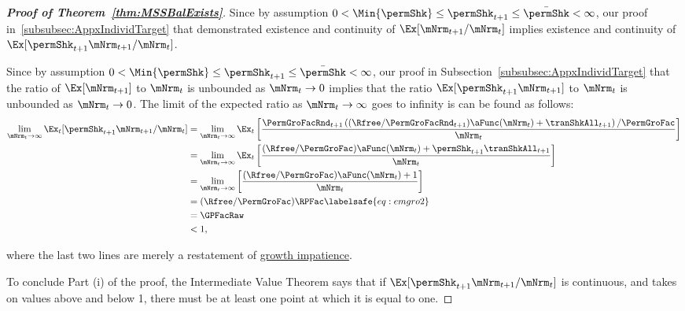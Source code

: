 \documentclass[\econtexRoot/BufferStockTheory]{subfiles}
\begin{document}
\begin{proof}[\textbf{Proof of Theorem~\ref{thm:MSSBalExists}}]

Since by assumption $ 0 < \Min{\permShk} \leq \permShk_{t+1} \leq \bar{\permShk} < \infty$, our proof in~\ref{subsubsec:AppxIndividTarget} that demonstrated existence and continuity of $\Ex[\mNrm_{t+1}/\mNrm_{t}]$ implies existence and continuity of $\Ex[\permShk_{t+1}\mNrm_{t+1}/\mNrm_{t}]$.



Since by assumption $ 0 < \Min{\permShk} \leq \permShk_{t+1} \leq \bar{\permShk} < \infty$, our proof in Subsection~\ref{subsubsec:AppxIndividTarget} that the ratio of $\Ex[\mNrm_{t+1}]$ to $\mNrm_{t}$ is unbounded as $\mNrm_{t} \rightarrow 0$ implies that the ratio $\Ex[\permShk_{t+1}\mNrm_{t+1}]$ to $\mNrm_{t}$ is unbounded as $\mNrm_{t} \rightarrow 0$. The limit of the expected ratio as $\mNrm_{t}\rightarrow \infty$ goes to infinity is can be found as follows:
%
\begin{align}
  \lim_{\mNrm_{t} \rightarrow \infty} \Ex_{t}[\permShk_{t+1}\mNrm_{t+1}/\mNrm_{t}]  & =   
                                                                  \lim_{\mNrm_{t} \rightarrow \infty} 
                                                                  \Ex_{t}\left[\frac{\PermGroFacRnd_{t+1}\left((\Rfree/\PermGroFacRnd_{t+1})\aFunc(\mNrm_{t})+{\tranShkAll}_{t+1}\right)/\PermGroFac}{\mNrm_{t}}\right] \notag 
  \\   & =   \lim_{\mNrm_{t} \rightarrow \infty} \Ex_{t}\left[
         \frac{(\Rfree/\PermGroFac)\aFunc(\mNrm_{t})+\permShk_{t+1}{\tranShkAll}_{t+1}}{\mNrm_{t}}
         \right] \notag 
  \\   & =   \lim_{\mNrm_{t} \rightarrow \infty} \left[
         \frac{(\Rfree/\PermGroFac)\aFunc(\mNrm_{t})+1}{\mNrm_{t}}
         \right] \notag 
  \\  & = (\Rfree/\PermGroFac)\RPFac \labelsafe{eq:emgro2}
  \\  & = \GPFacRaw \notag
  \\  & < 1, \notag
\end{align}

where the last two lines are merely a restatement of \hyperlink{GIC}{growth impatience}. 

To conclude Part (i) of the proof, the Intermediate Value Theorem says that if $\Ex[\permShk_{t+1}\mNrm_{t+1}/\mNrm_t]$ is continuous, and takes on values above and below 1, there must be at least one point at which it is equal to one.


\end{proof}
\end{document}
